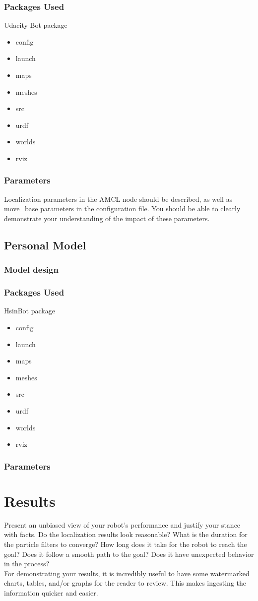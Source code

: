 \documentclass[10pt,journal,compsoc]{IEEEtran}
\begin{document}
\subsubsection{Packages Used}
Udacity Bot package
\begin{itemize}
\item config
\item launch
\item maps
\item meshes
\item src
\item urdf
\item worlds
\item rviz
\end {itemize}
\subsubsection{Parameters}
Localization parameters in the AMCL node should be described, as well as move\_base parameters in the configuration file. You should be able to clearly demonstrate your understanding of the impact of these parameters.

\subsection{Personal Model}
\subsubsection{Model design}
\subsubsection{Packages Used}
HsinBot package
\begin{itemize}
\item config
\item launch
\item maps
\item meshes
\item src
\item urdf
\item worlds
\item rviz
\end {itemize}
\subsubsection{Parameters}


\section{Results}
Present an unbiased view of your robot's performance and justify your stance with facts. Do the localization results look reasonable? What is the duration for the particle filters to converge? How long does it take for the robot to reach the goal? Does it follow a smooth path to the goal? Does it have unexpected behavior in the process? \\
For demonstrating your results, it is incredibly useful to have some watermarked charts, tables, and/or graphs for the reader to review. This makes ingesting the information quicker and easier.
\end{document}

